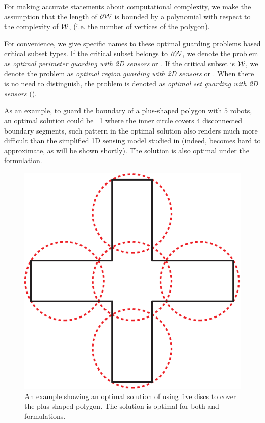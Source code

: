 For making accurate statements about computational complexity, we make
the assumption that the length of $\partial \mathcal W$ is bounded by a polynomial with respect 
to the complexity of $\mathcal W$, (i.e. the number of vertices of the polygon). 

For convenience, we give specific names to these optimal guarding 
problems based critical subset types. If the critical 
subset belongs to $\partial \mathcal W$, we denote the problem as {\em optimal 
perimeter guarding with 2D sensors} or \opgt. If the critical subset 
is $\mathcal W$, we denote the problem as {\em optimal region guarding with 
2D sensors} or \orgt. When there is no need to distinguish, the problem 
is denoted as {\em optimal set guarding with 2D sensors} (\osgt). 

As an example, to guard the boundary of a plus-shaped polygon with $5$ 
robots, an optimal solution could be ~\ref{fig:osg-example} where the 
inner circle covers $4$ disconnected boundary segments, such pattern 
in the optimal solution also renders \opgt much more difficult than 
the simplified 1D sensing model studied in \cite{fenghangaoyu2019efficient} 
(indeed, \opgt becomes hard to approximate, as will be shown shortly). 
The solution is also optimal under the \orgt formulation.
\begin{figure}[ht]
    \centering
		\vspace*{3mm}
    \includegraphics[scale=0.35]{chapters/osg/figures/exp_fig-e-eps-converted-to.pdf}
		\vspace*{1.5mm}
    \caption{An example showing an optimal solution of using five discs
		to cover the plus-shaped polygon. The solution is optimal for both 
		\opgt and \orgt formulations.}
    \label{fig:osg-example}
\end{figure}

